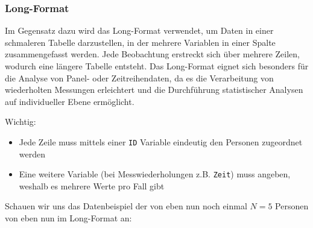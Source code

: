 \documentclass[
]{book}
\providecommand{\tightlist}{%
  \setlength{\itemsep}{0pt}\setlength{\parskip}{0pt}}
\begin{document}
\subsubsection{Long-Format}\label{long-format}

Im Gegensatz dazu wird das Long-Format verwendet, um Daten in einer schmaleren Tabelle darzustellen, in der mehrere Variablen in einer Spalte zusammengefasst werden. Jede Beobachtung erstreckt sich über mehrere Zeilen, wodurch eine längere Tabelle entsteht. Das Long-Format eignet sich besonders für die Analyse von Panel- oder Zeitreihendaten, da es die Verarbeitung von wiederholten Messungen erleichtert und die Durchführung statistischer Analysen auf individueller Ebene ermöglicht.

Wichtig:

\begin{itemize}
\tightlist
\item
  Jede Zeile muss mittels einer \texttt{ID} Variable eindeutig den Personen zugeordnet werden
\item
  Eine weitere Variable (bei Messwiederholungen z.B. \texttt{Zeit}) muss angeben, weshalb es mehrere Werte pro Fall gibt
\end{itemize}

Schauen wir uns das Datenbeispiel der von eben nun noch einmal \(N=5\) Personen von eben nun im Long-Format an:
\end{document}

